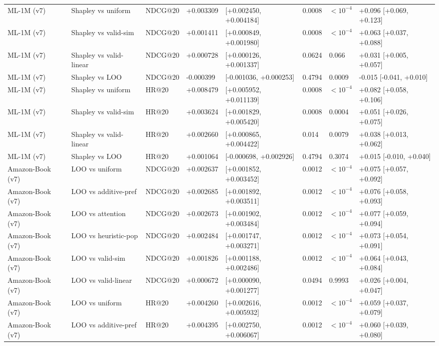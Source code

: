\documentclass[pdflatex,sn-mathphys-num]{sn-jnl}
\begin{document}
\begin{table}[t]
{\begin{tabular}{llllllll}
ML-1M (v7) & Shapley vs uniform & NDCG@20 & +0.003309 & [+0.002450, +0.004184] & 0.0008 & $<10^{-4}$ & +0.096 [+0.069, +0.123] \\
ML-1M (v7) & Shapley vs valid-sim & NDCG@20 & +0.001411 & [+0.000849, +0.001980] & 0.0008 & $<10^{-4}$ & +0.063 [+0.037, +0.088] \\
ML-1M (v7) & Shapley vs valid-linear & NDCG@20 & +0.000728 & [+0.000126, +0.001337] & 0.0624 & 0.066 & +0.031 [+0.005, +0.057] \\
ML-1M (v7) & Shapley vs LOO & NDCG@20 & -0.000399 & [-0.001036, +0.000253] & 0.4794 & 0.0009 & -0.015 [-0.041, +0.010] \\
ML-1M (v7) & Shapley vs uniform & HR@20 & +0.008479 & [+0.005952, +0.011139] & 0.0008 & $<10^{-4}$ & +0.082 [+0.058, +0.106] \\
ML-1M (v7) & Shapley vs valid-sim & HR@20 & +0.003624 & [+0.001829, +0.005420] & 0.0008 & 0.0004 & +0.051 [+0.026, +0.075] \\
ML-1M (v7) & Shapley vs valid-linear & HR@20 & +0.002660 & [+0.000865, +0.004422] & 0.014 & 0.0079 & +0.038 [+0.013, +0.062] \\
ML-1M (v7) & Shapley vs LOO & HR@20 & +0.001064 & [-0.000698, +0.002926] & 0.4794 & 0.3074 & +0.015 [-0.010, +0.040] \\
Amazon-Book (v7) & LOO vs uniform & NDCG@20 & +0.002637 & [+0.001852, +0.003452] & 0.0012 & $<10^{-4}$ & +0.075 [+0.057, +0.092] \\
Amazon-Book (v7) & LOO vs additive-pref & NDCG@20 & +0.002685 & [+0.001892, +0.003511] & 0.0012 & $<10^{-4}$ & +0.076 [+0.058, +0.093] \\
Amazon-Book (v7) & LOO vs attention & NDCG@20 & +0.002673 & [+0.001902, +0.003484] & 0.0012 & $<10^{-4}$ & +0.077 [+0.059, +0.094] \\
Amazon-Book (v7) & LOO vs heuristic-pop & NDCG@20 & +0.002484 & [+0.001747, +0.003271] & 0.0012 & $<10^{-4}$ & +0.073 [+0.054, +0.091] \\
Amazon-Book (v7) & LOO vs valid-sim & NDCG@20 & +0.001826 & [+0.001188, +0.002486] & 0.0012 & $<10^{-4}$ & +0.064 [+0.043, +0.084] \\
Amazon-Book (v7) & LOO vs valid-linear & NDCG@20 & +0.000672 & [+0.000090, +0.001277] & 0.0494 & 0.9993 & +0.026 [+0.004, +0.047] \\
Amazon-Book (v7) & LOO vs uniform & HR@20 & +0.004260 & [+0.002616, +0.005932] & 0.0012 & $<10^{-4}$ & +0.059 [+0.037, +0.079] \\
Amazon-Book (v7) & LOO vs additive-pref & HR@20 & +0.004395 & [+0.002750, +0.006067] & 0.0012 & $<10^{-4}$ & +0.060 [+0.039, +0.080] \\

\end{tabular}}
\end{table}
\end{document}
